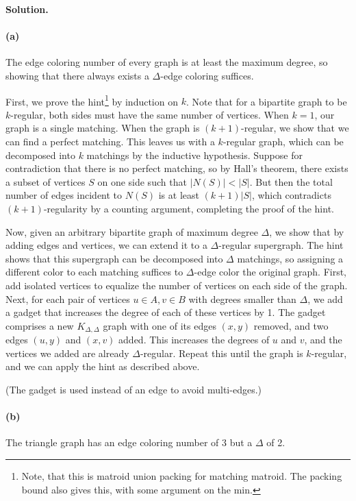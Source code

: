 \documentclass[11pt,letterpaper]{article}
\theoremstyle{definition}
\newcommand{\solution}{\medskip\noindent\textbf{Solution.}\par\medskip}
\begin{document}
\solution
\paragraph{(a)} The edge coloring number of every graph is at least the maximum degree, so showing that there always exists a $\Delta$-edge coloring suffices.

First, we prove the hint\footnote{Note, that this is matroid union packing for matching matroid. The packing bound also gives this, with some argument on the min.} by induction on $k$.
Note that for a bipartite graph to be $k$-regular, both sides must have the same number of vertices.
When $k=1$, our graph is a single matching.
When the graph is $(k+1)$-regular, we show that we can find a perfect matching.
This leaves us with a $k$-regular graph, which can be decomposed into $k$ matchings by the inductive hypothesis.
Suppose for contradiction that there is no perfect matching, so by Hall's theorem, there exists a subset of vertices $S$ on one side such that $|N(S)|<|S|$.
But then the total number of edges incident to $N(S)$ is at least $(k+1)|S|$, which contradicts $(k+1)$-regularity by a counting argument, completing the proof of the hint.

Now, given an arbitrary bipartite graph of maximum degree $\Delta$, we show that by adding edges and vertices, we can extend it to a $\Delta$-regular supergraph. 
The hint shows that this supergraph can be decomposed into $\Delta$ matchings, so assigning a different color to each matching suffices to $\Delta$-edge color the original graph.
First, add isolated vertices to equalize the number of vertices on each side of the graph.
Next, for each pair of vertices $u\in A,v\in B$ with degrees smaller than $\Delta$, we add a gadget that increases the degree of each of these vertices by 1.
The gadget comprises a new $K_{\Delta,\Delta}$ graph with one of its edges $(x,y)$ removed, and two edges $(u,y)$ and $(x,v)$ added.
This increases the degrees of $u$ and $v$, and the vertices we added are already $\Delta$-regular.
Repeat this until the graph is $k$-regular, and we can apply the hint as described above. 

(The gadget is used instead of an edge to avoid multi-edges.)

\paragraph{(b)} The triangle graph has an edge coloring number of 3 but a $\Delta$ of 2.
\end{document}
